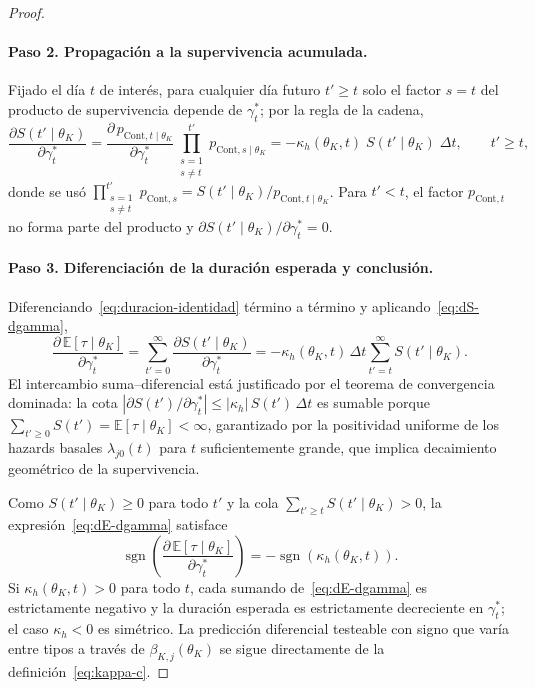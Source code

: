 \documentclass[12pt]{article}
\theoremstyle{definition}
\theoremstyle{remark}
\newcommand{\1}{\mathbf{1}}
\begin{document}
\begin{proof}
\paragraph{Paso 2. Propagación a la supervivencia acumulada.}
Fijado el día $t$ de interés, para cualquier día futuro $t'\ge t$ solo el factor
$s=t$ del producto de supervivencia depende de $\gamma_t^\ast$; por la regla de la cadena,
\begin{equation}
\label{eq:dS-dgamma}
\frac{\partial S(t'\mid\theta_K)}{\partial\gamma_t^\ast}
= \frac{\partial\,p_{\mathrm{Cont},t\mid\theta_K}}{\partial\gamma_t^\ast}
  \prod_{\substack{s=1\\s\neq t}}^{t'}p_{\mathrm{Cont},s\mid\theta_K}
= -\kappa_h(\theta_K,t)\;S(t'\mid\theta_K)\;\Delta t,
\qquad t'\ge t,
\end{equation}
donde se usó $\prod_{\substack{s=1\\s\neq t}}^{t'}p_{\mathrm{Cont},s}
= S(t'\mid\theta_K)/p_{\mathrm{Cont},t\mid\theta_K}$.
Para $t'<t$, el factor $p_{\mathrm{Cont},t}$ no forma parte del producto y
$\partial S(t'\mid\theta_K)/\partial\gamma_t^\ast=0$.

\paragraph{Paso 3. Diferenciación de la duración esperada y conclusión.}
Diferenciando~\eqref{eq:duracion-identidad} término a término y
aplicando~\eqref{eq:dS-dgamma},
\begin{equation}
\label{eq:dE-dgamma}
\frac{\partial\,\mathbb{E}[\tau\mid\theta_K]}{\partial\gamma_t^\ast}
= \sum_{t'=0}^{\infty}\frac{\partial S(t'\mid\theta_K)}{\partial\gamma_t^\ast}
= -\kappa_h(\theta_K,t)\,\Delta t\sum_{t'=t}^{\infty}S(t'\mid\theta_K).
\end{equation}
El intercambio suma–diferencial está justificado por el teorema de convergencia dominada:
la cota $|\partial S(t')/\partial\gamma_t^\ast|\le |\kappa_h|\,S(t')\,\Delta t$ es sumable
porque $\sum_{t'\ge 0}S(t')=\mathbb{E}[\tau\mid\theta_K]<\infty$, garantizado por la
positividad uniforme de los hazards basales $\lambda_{j0}(t)$ para $t$ suficientemente
grande, que implica decaimiento geométrico de la supervivencia.

Como $S(t'\mid\theta_K)\ge 0$ para todo $t'$ y la cola
$\sum_{t'\ge t}S(t'\mid\theta_K)>0$, la expresión~\eqref{eq:dE-dgamma} satisface
\[
\operatorname{sgn}\!\left(\frac{\partial\,\mathbb{E}[\tau\mid\theta_K]}{\partial\gamma_t^\ast}\right)
= -\operatorname{sgn}\!\left(\kappa_h(\theta_K,t)\right).
\]
Si $\kappa_h(\theta_K,t)>0$ para todo $t$, cada sumando de~\eqref{eq:dE-dgamma} es
estrictamente negativo y la duración esperada es estrictamente decreciente en $\gamma_t^\ast$;
el caso $\kappa_h<0$ es simétrico. La predicción diferencial testeable con signo que
varía entre tipos a través de $\beta_{K,j}(\theta_K)$ se sigue directamente de la
definición~\eqref{eq:kappa-c}.
\end{proof}
\end{document}
